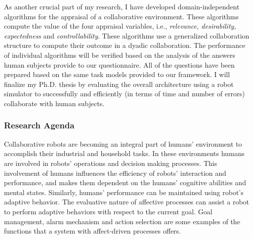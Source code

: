 \documentclass[a4paper, 10pt]{article}
\begin{document}
\begin{small}

As another crucial part of my research, I have developed domain-independent
algorithms for the appraisal of a collaborative environment. These algorithms
compute the value of the four appraisal variables, i.e., \textit{relevance,
desirability, expectedness} and \textit{controllability}. These algorithms use a
generalized collaboration structure to compute their outcome in a dyadic
collaboration. The performance of individual algorithms will be verified based
on the analysis of the answers human subjects provide to our questionnaire. All
of the questions have been prepared based on the same task models provided to
our framework. I will finalize my Ph.D. thesis by evaluating the overall
architecture using a robot simulator to successfully and efficiently (in terms
of time and number of errors) collaborate with human subjects.

\subsubsection*{Research Agenda}

Collaborative robots are becoming an integral part of humans' environment to
accomplish their industrial and household tasks. In these environments humans
are involved in robots' operations and decision making processes. This
involvement of humans influences the efficiency of robots' interaction and
performance, and makes them dependent on the humans' cognitive abilities and
mental states. Similarly, humans' performance can be maintained using robot's
adaptive behavior. The evaluative nature of affective processes can assist a
robot to perform adaptive behaviors with respect to the current goal. Goal
management, alarm mechanism and action selection are some examples of the
functions that a system with affect-driven processes offers.


\end{small}
\end{document}
